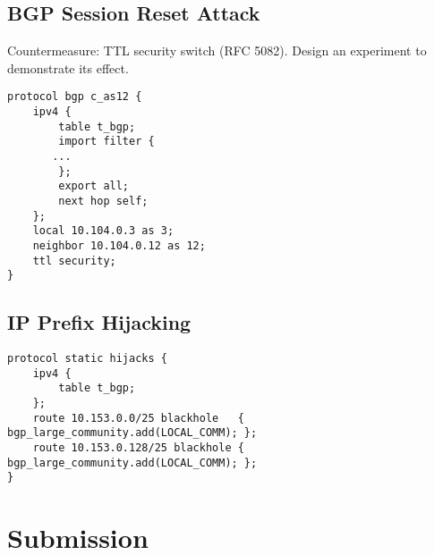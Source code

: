 \subsection{BGP Session Reset Attack} 



Countermeasure: TTL security switch (RFC 5082).
Design an experiment to demonstrate its effect.

\begin{lstlisting}
protocol bgp c_as12 {
    ipv4 {
        table t_bgp;
        import filter {
	   ...
        };
        export all;
        next hop self;
    };
    local 10.104.0.3 as 3;
    neighbor 10.104.0.12 as 12;
    ttl security;
}
\end{lstlisting}
 

\subsection{IP Prefix Hijacking} 



\begin{lstlisting}
protocol static hijacks {
    ipv4 {
        table t_bgp;
    };
    route 10.153.0.0/25 blackhole   { bgp_large_community.add(LOCAL_COMM); };
    route 10.153.0.128/25 blackhole { bgp_large_community.add(LOCAL_COMM); };
}
\end{lstlisting}
 


\section{Submission}









